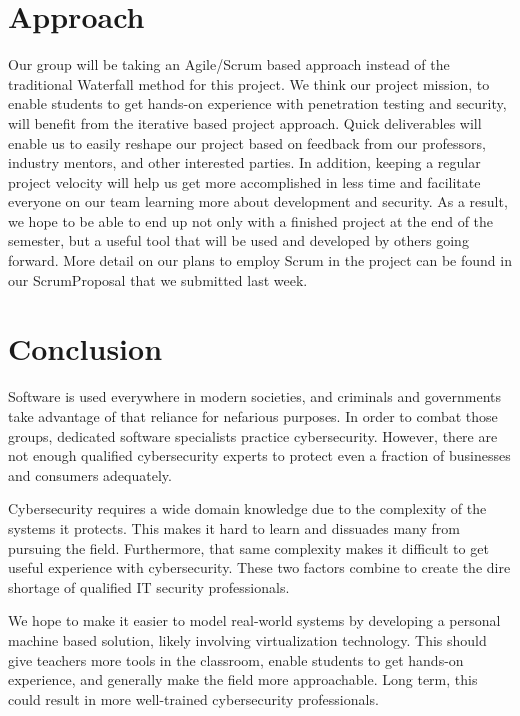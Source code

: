 \documentclass[openright]{report}
\begin{document}
\section{Approach}

\par Our group will be taking an Agile/Scrum based approach instead of the traditional Waterfall method for this project. We think our project mission, to enable students to get hands-on experience with penetration testing and security, will benefit from the iterative based project approach. Quick deliverables will enable us to easily reshape our project based on feedback from our professors, industry mentors, and other interested parties. In addition, keeping a regular project velocity will help us get more accomplished in less time and facilitate everyone on our team learning more about development and security. As a result, we hope to be able to end up not only with a finished project at the end of the semester, but a useful tool that will be used and developed by others going forward. More detail on our plans to employ Scrum in the project can be found in our ScrumProposal that we submitted last week.

\section{Conclusion}

\par Software is used everywhere in modern societies, and criminals and governments take advantage of that reliance for nefarious purposes. In order to combat those groups, dedicated software specialists practice cybersecurity. However, there are not enough qualified cybersecurity experts to protect even a fraction of businesses and consumers adequately.

\par Cybersecurity requires a wide domain knowledge due to the complexity of the systems it protects. This makes it hard to learn and dissuades many from pursuing the field. Furthermore, that same complexity makes it difficult to get useful experience with cybersecurity. These two factors combine to create the dire shortage of qualified IT security professionals.

\par We hope to make it easier to model real-world systems by developing a personal machine based solution, likely involving virtualization technology. This should give teachers more tools in the classroom, enable students to get hands-on experience, and generally make the field more approachable. Long term, this could result in more well-trained cybersecurity professionals. 
\end{document}
